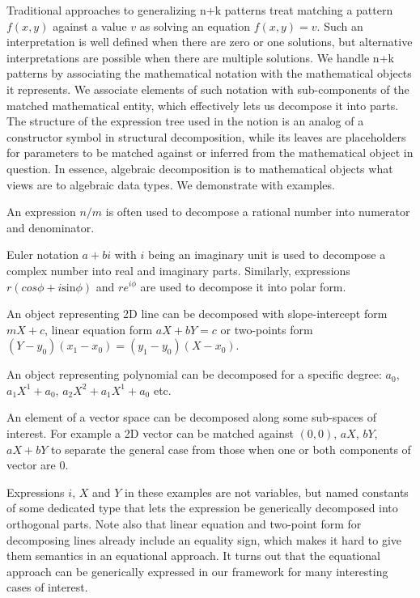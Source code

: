 Traditional approaches to generalizing n+k patterns treat matching a pattern 
$f(x,y)$ against a value $v$ as solving an equation $f(x,y)=v$\cite{OosterhofThesis}. 
Such an interpretation is well defined when there are zero or one solutions,
but alternative interpretations are possible when there are multiple solutions. 
We handle n+k patterns by 
associating the mathematical notation with the mathematical objects it 
represents. 
We associate elements of such notation with 
sub-components of the matched mathematical entity, which 
effectively lets us decompose it into parts. The structure of the expression 
tree used in the notion is an analog of a constructor symbol in structural 
decomposition, while its leaves are placeholders for parameters to be matched 
against or inferred from the mathematical object in question. In essence,
algebraic decomposition is to mathematical objects what views are to algebraic 
data types. We demonstrate with examples.

\begin{compactitem}
\setlength{\itemsep}{0pt}
\setlength{\parskip}{0pt}
\item An expression $n/m$ is often used to decompose a rational number into 
      numerator and denominator.
\item Euler notation $a+bi$ with $i$ being an imaginary unit is used to 
      decompose a complex number into real and imaginary parts. Similarly, 
      expressions $r(cos \phi + i\mathrm{sin} \phi)$ and $re^{i\phi}$ are used to 
      decompose it into polar form.
\item An object representing 2D line can be decomposed with slope-intercept form 
      $mX+c$, linear equation form $aX+bY=c$ or two-points form 
      $(Y-y_0)(x_1-x_0)=(y_1-y_0)(X-x_0)$.
\item An object representing polynomial can be decomposed for a specific degree: 
      $a_0$, $a_1X^1+a_0$, $a_2X^2+a_1X^1+a_0$ etc.
\item An element of a vector space can be decomposed along some sub-spaces of 
      interest. For example a 2D vector can be matched against $(0,0)$, $aX$, 
      $bY$, $aX+bY$ to separate the general case from those when one or both
      components of vector are $0$.
\end{compactitem}

\noindent
Expressions $i$, $X$ and $Y$ in these examples are not variables, but named 
constants of some dedicated type that lets the expression be generically 
decomposed into orthogonal parts. Note also that linear equation and two-point 
form for decomposing lines already include an equality sign, which makes it 
hard to give them semantics in an equational approach. It turns out that the 
equational approach can be generically expressed in our framework for many 
interesting cases of interest.

